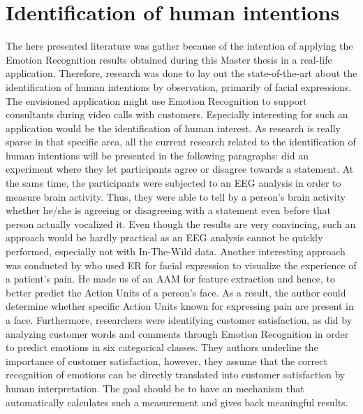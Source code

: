 
\section{Identification of human intentions}
The here presented literature was gather because of the intention of applying the Emotion Recognition results obtained during this Master thesis in a real-life application. Therefore, research was done to lay out the state-of-the-art about the identification of human intentions by observation, primarily of facial expressions. The envisioned application might use Emotion Recognition to support consultants during video calls with customers.
\newline\newline
Especially interesting for such an application would be the identification of human interest. As research is really sparse in that specific area, all the current research related to the identification of human intentions will be presented in the following paragraphs:
\newline\newline
\citet{Dong:2012:UnderstandHumanImplicitIntention} did an experiment where they let participants agree or disagree towards a statement. At the same time, the participants were subjected to an \gls{EEG} analysis in order to measure brain activity. Thus, they were able to tell by a person's brain activity whether he/she is agreeing or disagreeing with a statement even before that person actually vocalized it. Even though the results are very convincing, such an approach would be hardly practical as an \gls{EEG} analysis cannot be quickly performed, especially not with In-The-Wild data.
\newline\newline
Another interesting approach was conducted by \citet{Esser:2018:LandmarkDetection} who used \gls{ER} for facial expression to visualize the experience of a patient's pain. He made us of an \gls{AAM} for feature extraction and hence, to better predict the Action Units of a person's face. As a result, the author could determine whether specific Action Units known for expressing pain are present in a face. 
\newline\newline
Furthermore, researchers were identifying customer satisfaction, as did \citet{Ren:2012:ERforCustomerSatisfaction} by analyzing customer words and comments through Emotion Recognition in order to predict emotions in six categorical classes. They authors underline the importance of customer satisfaction, however, they assume that the correct recognition of emotions can be directly translated into customer satisfaction by human interpretation. The goal should be to have an mechanism that automatically calculates such a measurement and gives back meaningful results.
